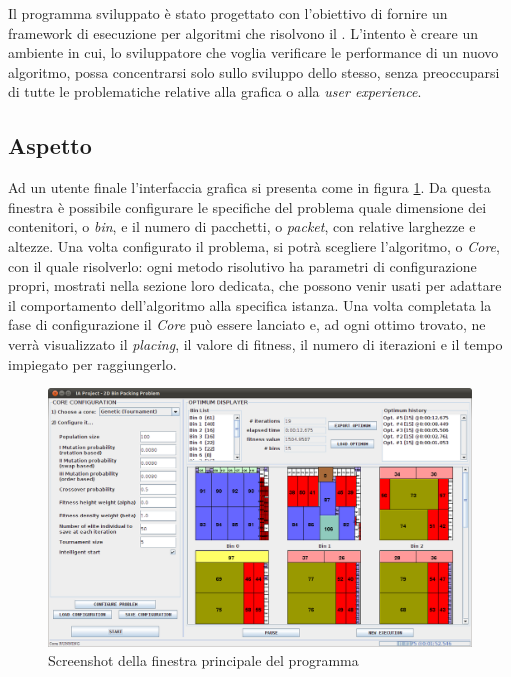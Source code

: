 Il programma sviluppato è stato progettato con l'obiettivo di fornire un framework di esecuzione per algoritmi che risolvono il \ddbpp. L'intento è creare un ambiente in cui, lo sviluppatore che voglia verificare le performance di un nuovo algoritmo, possa concentrarsi solo sullo sviluppo dello stesso, senza preoccuparsi di tutte le problematiche relative alla grafica o alla \emph{user experience}.

\subsection{Aspetto}
Ad un utente finale l'interfaccia grafica si presenta come in figura \ref{fig:main_window_ss}. Da questa finestra è possibile configurare le specifiche del problema quale dimensione dei contenitori, o \emph{bin}, e il numero di pacchetti, o \emph{packet}, con relative larghezze e altezze. Una volta configurato il problema, si potrà scegliere l'algoritmo, o \emph{Core}, con il quale risolverlo: ogni metodo risolutivo ha parametri di configurazione propri, mostrati nella sezione loro dedicata, che possono venir usati per adattare il comportamento dell'algoritmo alla specifica istanza. Una volta completata la fase di configurazione il \emph{Core} può essere lanciato e, ad ogni ottimo trovato, ne verrà visualizzato il \emph{placing}, il valore di fitness, il numero di iterazioni e il tempo impiegato per raggiungerlo.

\begin{figure}[h!tp]
 \centering
 \includegraphics[width=\textwidth]{./img/main_window_ss.png}
 \caption{Screenshot della finestra principale del programma}
 \label{fig:main_window_ss}
\end{figure}

